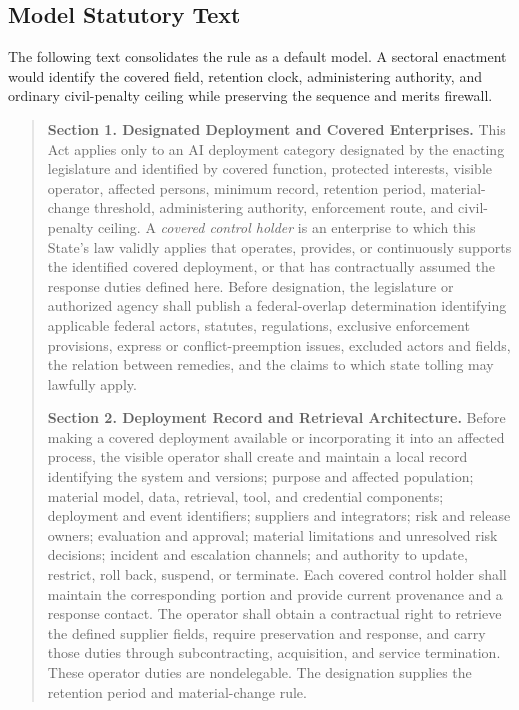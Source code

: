 \subsection{Model Statutory Text}
\label{sec:model-text}

The following text consolidates the rule as a default model. A sectoral enactment would identify the covered field, retention clock, administering authority, and ordinary civil-penalty ceiling while preserving the sequence and merits firewall.

\begin{quote}
\small
\textbf{Section 1. Designated Deployment and Covered Enterprises.} This Act applies only to an AI deployment category designated by the enacting legislature and identified by covered function, protected interests, visible operator, affected persons, minimum record, retention period, material-change threshold, administering authority, enforcement route, and civil-penalty ceiling. A \emph{covered control holder} is an enterprise to which this State's law validly applies that operates, provides, or continuously supports the identified covered deployment, or that has contractually assumed the response duties defined here. Before designation, the legislature or authorized agency shall publish a federal-overlap determination identifying applicable federal actors, statutes, regulations, exclusive enforcement provisions, express or conflict-preemption issues, excluded actors and fields, the relation between remedies, and the claims to which state tolling may lawfully apply.

\textbf{Section 2. Deployment Record and Retrieval Architecture.} Before making a covered deployment available or incorporating it into an affected process, the visible operator shall create and maintain a local record identifying the system and versions; purpose and affected population; material model, data, retrieval, tool, and credential components; deployment and event identifiers; suppliers and integrators; risk and release owners; evaluation and approval; material limitations and unresolved risk decisions; incident and escalation channels; and authority to update, restrict, roll back, suspend, or terminate. Each covered control holder shall maintain the corresponding portion and provide current provenance and a response contact. The operator shall obtain a contractual right to retrieve the defined supplier fields, require preservation and response, and carry those duties through subcontracting, acquisition, and service termination. These operator duties are nondelegable. The designation supplies the retention period and material-change rule.


\end{quote}
